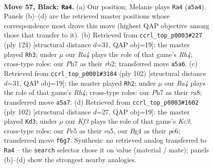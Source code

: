 \documentclass[11pt]{article}
\begin{document}
\clearpage

\begin{figure}[p]\centering
\begin{subfigure}{0.46\textwidth}\centering
\resizebox{\linewidth}{!}{%
\newchessgame
\chessboard[
  setfen={8/7p/5k2/r3p3/1pK3b1/8/4n1r1/8 b - - 5 57},
  showmover=false,
  pgfstyle=straightmove, color=movearrow, markmove={a5-a4}
]}
\caption{}
\end{subfigure}\hfill
\begin{subfigure}{0.46\textwidth}\centering
\resizebox{\linewidth}{!}{%
\newchessgame
\chessboard[
  setfen={8/7k/7P/5P2/5K1R/8/1r6/8 w - - 5 63},
  showmover=false,
  pgfstyle=straightmove, color=movearrow, markmove={h4-h3}
]}
\caption{}
\end{subfigure}
\\[4pt]
\begin{subfigure}{0.46\textwidth}\centering
\resizebox{\linewidth}{!}{%
\newchessgame
\chessboard[
  setfen={r7/7k/7P/5P2/5K1R/8/8/8 w - - 5 52},
  showmover=false,
  pgfstyle=straightmove, color=movearrow, markmove={h4-h2}
]}
\caption{}
\end{subfigure}\hfill
\begin{subfigure}{0.46\textwidth}\centering
\resizebox{\linewidth}{!}{%
\newchessgame
\chessboard[
  setfen={8/1k6/1P2p3/r7/8/2K5/1R5P/8 w - - 7 52},
  showmover=false,
  pgfstyle=straightmove, color=movearrow, markmove={c3-d3}
]}
\caption{}
\end{subfigure}
\caption{\textbf{Move 57, Black: \texttt{Ra4}.} (a) Our position; Melanie plays \texttt{Ra4} (\texttt{a5a4}). Panels (b)--(d) are the retrieved master positions whose correspondence most drove this move (highest QAP objective among those that transfer to it). (b) Retrieved from \texttt{ccrl\_top\_p0003\#227} (ply 124) [structural distance $d$=31, QAP obj=19]: the master played \texttt{Rh3}; under $\mu$ our \emph{Ra4} plays the role of that game's \emph{Rh4}; cross-type roles: our \emph{P}h7 as their \emph{r}b2; transferred move \texttt{a5a6}. (c) Retrieved from \texttt{ccrl\_top\_p0001\#3184} (ply 102) [structural distance $d$=31, QAP obj=19]: the master played \texttt{Rh2}; under $\mu$ our \emph{Ra4} plays the role of that game's \emph{Rh4}; cross-type roles: our \emph{P}h7 as their \emph{r}a8; transferred move \texttt{a5a7}. (d) Retrieved from \texttt{ccrl\_top\_p0003\#1602} (ply 102) [structural distance $d$=27, QAP obj=19]: the master played \texttt{Kd3}; under $\mu$ our \emph{Kf3} plays the role of that game's \emph{Kc3}; cross-type roles: our \emph{P}e5 as their \emph{r}a5, our \emph{B}g4 as their \emph{p}e6; transferred move \texttt{f6g7}. Synthesis: no retrieved analog transferred to \texttt{Ra4} -- the \texttt{search} selector chose it on value (material / mate); panels (b)--(d) show the strongest nearby analogies.}
\label{fig:thought-m113}
\end{figure}
\end{document}
